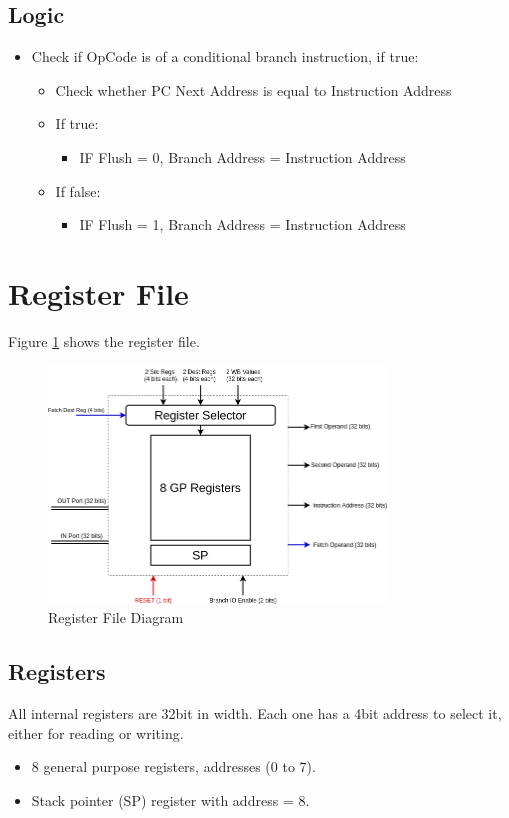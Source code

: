 \subsection{Logic}
\begin{itemize}
    \item Check if OpCode is of a conditional branch instruction, if true:
    \begin{itemize}
        \item Check whether PC Next Address is equal to Instruction Address
        \item If true:
        \begin{itemize}
            \item IF Flush = 0, Branch Address = Instruction Address
        \end{itemize}
        \item If false:
        \begin{itemize}
            \item IF Flush = 1, Branch Address = Instruction Address
        \end{itemize}
    \end{itemize}
\end{itemize}

\section{Register File}
Figure \ref{fig:reg_file} shows the register file.
\begin{figure}[hp]
    \centering
    \includegraphics[width=0.8\textwidth]{images/reg_file.png}
    \caption{Register File Diagram}
    \label{fig:reg_file}
\end{figure}

\subsection{Registers}
All internal registers are 32bit in width. Each one has a 4bit address to select it, either for reading or writing.
\begin{itemize}
    \item 8 general purpose registers, addresses (0 to 7).
    \item Stack pointer (SP) register with address = 8.
\end{itemize}

